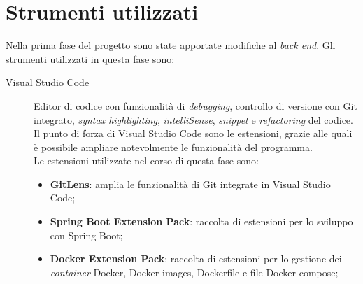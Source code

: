 \section{Strumenti utilizzati}
Nella prima fase del progetto sono state apportate modifiche al \textit{back
      end}. Gli strumenti utilizzati in questa fase sono:
\begin{description}
      \item[Visual Studio Code] Editor di codice con
            funzionalità di \textit{debugging}, controllo di versione con Git
            integrato,
            \textit{syntax highlighting}, \textit{intelliSense},
            \textit{snippet} e \textit{refactoring} del codice.\\
            Il punto di forza di Visual Studio Code sono le estensioni, grazie
            alle quali è possibile ampliare notevolmente le funzionalità del
            programma.\\
            Le estensioni utilizzate nel corso di questa fase sono:
            \begin{itemize}
                  \item \textbf{GitLens}: amplia le funzionalità di Git
                        integrate in
                        Visual Studio Code;
                  \item \textbf{Spring Boot Extension Pack}: raccolta di
                        estensioni per lo sviluppo con Spring Boot;

                  \item \textbf{Docker Extension Pack}: raccolta di estensioni
                        per lo
                        gestione dei \textit{container} Docker, Docker images,
                        Dockerfile e
                        file
                        Docker-compose;


\end{itemize}
\end{description}
